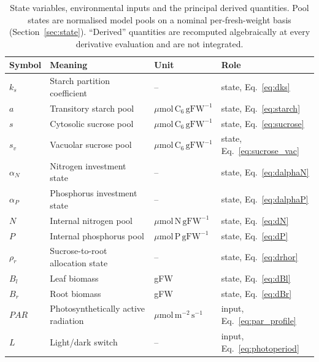 \begin{table}[!htbp]
\centering
\small
\caption{State variables, environmental inputs and the principal derived
quantities. Pool states are normalised model pools on a nominal per-fresh-weight
basis (Section~\ref{sec:state}). ``Derived'' quantities are recomputed
algebraically at every derivative evaluation and are not integrated.}
\label{tab:states}
\begin{tabular}{@{}lllp{34mm}@{}}
\toprule
Symbol & Meaning & Unit & Role \\
\midrule
$k_s$        & Starch partition coefficient       & --                            & state, Eq.~\eqref{eq:dks} \\
$a$          & Transitory starch pool             & $\mu\mathrm{mol\,C_6\,gFW^{-1}}$ & state, Eq.~\eqref{eq:starch} \\
$s$          & Cytosolic sucrose pool             & $\mu\mathrm{mol\,C_6\,gFW^{-1}}$ & state, Eq.~\eqref{eq:sucrose} \\
$s_v$        & Vacuolar sucrose pool              & $\mu\mathrm{mol\,C_6\,gFW^{-1}}$ & state, Eq.~\eqref{eq:sucrose_vac} \\
$\alpha_N$   & Nitrogen investment state          & --                            & state, Eq.~\eqref{eq:dalphaN} \\
$\alpha_P$   & Phosphorus investment state        & --                            & state, Eq.~\eqref{eq:dalphaP} \\
$N$          & Internal nitrogen pool             & $\mu\mathrm{mol\,N\,gFW^{-1}}$ & state, Eq.~\eqref{eq:dN} \\
$P$          & Internal phosphorus pool           & $\mu\mathrm{mol\,P\,gFW^{-1}}$ & state, Eq.~\eqref{eq:dP} \\
$\rho_r$     & Sucrose-to-root allocation state   & --                            & state, Eq.~\eqref{eq:drhor} \\
$B_l$        & Leaf biomass                       & gFW                           & state, Eq.~\eqref{eq:dBl} \\
$B_r$        & Root biomass                       & gFW                           & state, Eq.~\eqref{eq:dBr} \\
\midrule
$\mathit{PAR}$ & Photosynthetically active radiation & $\mu\mathrm{mol\,m^{-2}\,s^{-1}}$ & input, Eq.~\eqref{eq:par_profile} \\
$L$          & Light/dark switch                  & --                            & input, Eq.~\eqref{eq:photoperiod} \\

\end{tabular}
\end{table}
